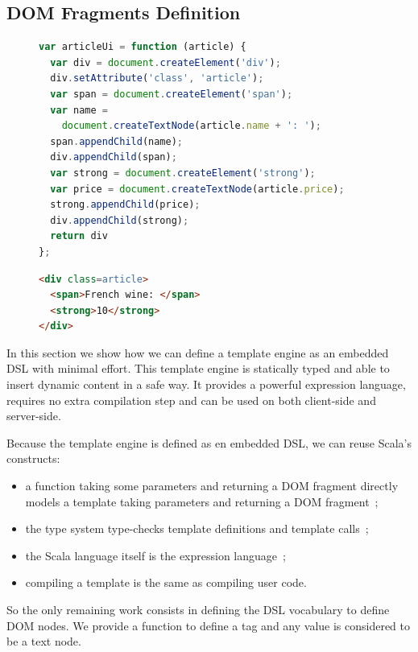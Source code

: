 \documentclass[preprint]{sigplanconf}
\begin{document}
\subsection{DOM Fragments Definition}

\begin{figure}
\begin{lstlisting}[language=JavaScript,caption=JavaScript DOM API,label=dom-api]
var articleUi = function (article) {
  var div = document.createElement('div');
  div.setAttribute('class', 'article');
  var span = document.createElement('span');
  var name =
    document.createTextNode(article.name + ': ');
  span.appendChild(name);
  div.appendChild(span);
  var strong = document.createElement('strong');
  var price = document.createTextNode(article.price);
  strong.appendChild(price);
  div.appendChild(strong);
  return div
};
\end{lstlisting}
\end{figure}

\begin{figure}
\begin{lstlisting}[language=HTML,caption=HTML,label=html]
<div class=article>
  <span>French wine: </span>
  <strong>10</strong>
</div>
\end{lstlisting}
\end{figure}

In this section we show how we can define a template engine as an embedded DSL with minimal effort. This template
engine is statically typed and able to insert dynamic content in a safe way. It provides a powerful expression
language, requires no extra compilation step and can be used on both client-side and server-side.

Because the template engine is defined as en embedded DSL, we can reuse Scala’s constructs:

\begin{itemize}
\item a function taking some parameters and returning a DOM fragment directly models a template taking parameters and
returning a DOM fragment~;
\item the type system type-checks template definitions and template calls~;
\item the Scala language itself is the expression language~;
\item compiling a template is the same as compiling user code.
\end{itemize}

So the only remaining work consists in defining the DSL vocabulary to define DOM nodes. We provide a 
function to define a tag and any  value is considered to be a text node.
\end{document}
